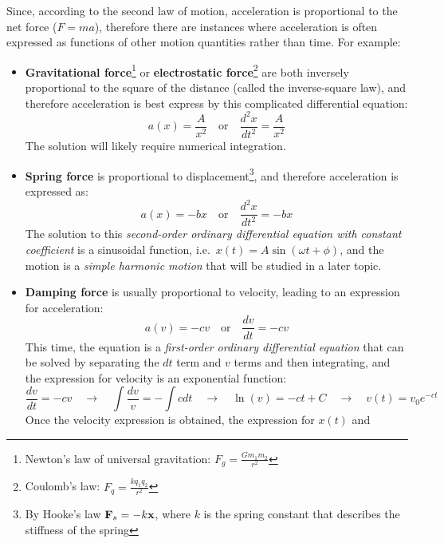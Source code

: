 \documentclass{../../../oss-handout}
\newcommand{\mb}[1]{\ensuremath\mathbf{#1}}
\begin{document}
Since, according to the second law of motion, acceleration is proportional to
the net force ($F=ma$), therefore there are instances where acceleration is
often expressed as functions of other motion quantities rather than time. For
example:
\begin{itemize}[leftmargin=15pt]
\item\textbf{Gravitational force}\footnote{Newton's law of universal
  gravitation: $\displaystyle F_g=\frac{Gm_1m_2}{r^2}$} or
  \textbf{electrostatic force}\footnote{Coulomb's law:
    $\displaystyle F_q=\frac{kq_1q_2}{r^2}$} are both inversely proportional to
  the square of the distance (called the inverse-square law), and therefore
  acceleration is best express by this complicated differential equation:
  \begin{equation*}
    a(x)=\frac{A}{x^2} \quad\text{or}\quad \frac{d^2x}{dt^2}=\frac{A}{x^2}
  \end{equation*}
  The solution will likely require numerical integration.
\item\textbf{Spring force} is proportional to displacement\footnote{By Hooke's
  law $\mb{F}_s=-k\mb{x}$, where $k$ is the spring constant that describes the
  stiffness of the spring}, and therefore acceleration is expressed as:
  \begin{equation*}
    a(x)=-bx\quad\text{or}\quad \frac{d^2x}{dt^2}=-bx
  \end{equation*}
  The solution to this \emph{second-order ordinary differential equation with
    constant coefficient} is a sinusoidal function, i.e.\
  $x(t)=A\sin(\omega t+\phi)$, and the motion is a \emph{simple harmonic
    motion} that will be studied in a later topic.
\item\textbf{Damping force}  is usually proportional to velocity, leading
  to an expression for acceleration:
  \begin{equation*}
    a(v)=-cv\quad\text{or}\quad \frac{dv}{dt}=-cv
  \end{equation*}
  This time, the equation is a \emph{first-order ordinary differential equation}
  that can be solved by separating the $dt$ term and $v$ terms and then
  integrating, and the expression for velocity is an exponential function:
  \begin{equation*}
    \frac{dv}{dt}=-cv\quad\rightarrow\quad \int\frac{dv}{v}=-\int cdt
    \quad\rightarrow\quad \ln(v)=-ct+C
    \quad\rightarrow\quad v(t)=v_0e^{-ct}
  \end{equation*}
  Once the velocity expression is obtained, the expression for $x(t)$ and

\end{itemize}
\end{document}
